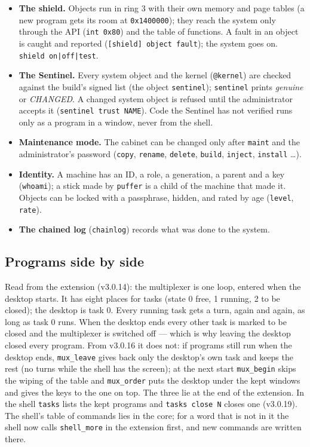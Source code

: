 \documentclass[11pt,a4paper]{article}
\newcommand{\cmd}[1]{\texttt{#1}}
\begin{document}
\begin{itemize}
\item \textbf{The shield.} Objects run in ring 3 with their own memory and page tables (a new
      program gets its room at \texttt{0x1400000}); they reach the system only through the API
      (\texttt{int 0x80}) and the table of functions. A fault in an object is caught and reported
      (\texttt{[shield] object fault}); the system goes on. \cmd{shield on|off|test}.
\item \textbf{The Sentinel.} Every system object and the kernel (\texttt{@kernel}) are checked
      against the build's signed list (the object \texttt{sentinel}); \cmd{sentinel} prints
      \emph{genuine} or \emph{CHANGED}. A changed system object is refused until the administrator
      accepts it (\cmd{sentinel trust NAME}). Code the Sentinel has not verified runs only as a
      program in a window, never from the shell.
\item \textbf{Maintenance mode.} The cabinet can be changed only after \cmd{maint} and the
      administrator's password (\cmd{copy}, \cmd{rename}, \cmd{delete}, \cmd{build},
      \cmd{inject}, \cmd{install} \ldots).
\item \textbf{Identity.} A machine has an ID, a role, a generation, a parent and a key
      (\cmd{whoami}); a stick made by \cmd{puffer} is a child of the machine that made it.
      Objects can be locked with a passphrase, hidden, and rated by age (\cmd{level}, \cmd{rate}).
\item \textbf{The chained log} (\texttt{chainlog}) records what was done to the system.
\end{itemize}

\subsection{Programs side by side}

Read from the extension (v3.0.14): the multiplexer is one loop, entered when the desktop starts.
It has eight places for tasks (state 0 free, 1 running, 2 to be closed); the desktop is task 0.
Every running task gets a turn, again and again, as long as task 0 runs. When the desktop ends
every other task is marked to be closed and the multiplexer is switched off --- which is why
leaving the desktop closed every program. From v3.0.16 it does not: if programs still run
when the desktop ends, \texttt{mux\_leave} gives back only the desktop's own task and keeps the
rest (no turns while the shell has the screen); at the next start \texttt{mux\_begin} skips the
wiping of the table and \texttt{mux\_order} puts the desktop under the kept windows and gives
the keys to the one on top. The three lie at the end of the extension. In the shell
\cmd{tasks} lists the kept programs and \cmd{tasks close N} closes one (v3.0.19). The shell's
table of commands lies in the core; for a word that is not in it the shell now calls
\texttt{shell\_more} in the extension first, and new commands are written there.
\end{document}
